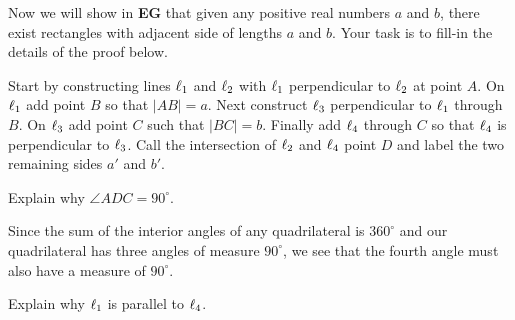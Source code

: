 \documentclass{ximera}
\begin{document}
\begin{problem}\label{112} 
Now we will show in \textbf{EG} that given any positive real numbers
$a$ and $b$, there exist rectangles with adjacent side of lengths $a$
and $b$. Your task is to fill-in the details of the proof below.

Start by constructing lines $\ell_1$ and $\ell_2$ with $\ell_1$
perpendicular to $\ell_2$ at point $A$. On $\ell_1$ add point $B$ so that
$|AB|=a$. Next construct $\ell_3$ perpendicular to $\ell_1$ through
$B$. On $\ell_3$ add point $C$ such that $|BC|=b$. Finally add $\ell_4$
through $C$ so that $\ell_4$ is perpendicular to $\ell_3$. Call the
intersection of $\ell_2$ and $\ell_4$ point $D$ and label the two
remaining sides $a'$ and $b'$.
\begin{image}
\end{image}
Explain why $\angle ADC = 90^\circ$.

\begin{freeResponse}
Since the sum of the interior angles of any quadrilateral is
$360^\circ$ and our quadrilateral has three angles of measure
$90^\circ$, we see that the fourth angle must also have a measure of
$90^\circ$.
\end{freeResponse}

Explain why $\ell_1$ is parallel to $\ell_4$.


\end{problem}
\end{document}
